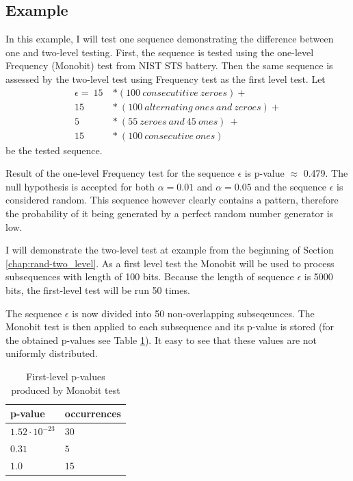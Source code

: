 \documentclass[
  digital,     %
  oneside,     %
  nosansbold,  %
  nocolorbold, %
  nolof,         %
  nolot,         %
]{fithesis4}
\begin{document}
\subsection{Example}
In this example, I will test one sequence demonstrating the difference between one and two-level testing. First, the sequence is tested using the one-level Frequency (Monobit) test from NIST STS battery.\cite[p. 2-2]{nist_special} Then the same sequence is assessed by the two-level test using Frequency test as the first level test. Let
\[\begin{split}
    \epsilon =\:15\: &* (100\:consecutitive\:zeroes) + \\
    15\:&*\:(100\:alternating\:ones\:and\:zeroes) + \\
    5\:&*\:(55\:zeroes\:and\:45\:ones)\:+\:\\
    15\:&*\:(100\:consecutive\:ones)
\end{split}\]
be the tested sequence. 

Result of the one-level Frequency test for the sequence $\epsilon$ is p-value $\approx$ 0.479. The null hypothesis is accepted for both $\alpha = 0.01$ and $\alpha = 0.05$ and the sequence $\epsilon$ is considered random. This sequence however clearly contains a pattern, therefore the probability of it being generated by a perfect random number generator is low.




I will demonstrate the two-level test at example from the beginning of Section \ref{chap:rand-two_level}. As a first level test the Monobit \cite[p. 2-2]{nist_special} will be used to process subsequences with length of 100 bits. Because the length of sequence $\epsilon$ is 5000 bits, the first-level test will be run 50 times.

The sequence $\epsilon$ is now divided into 50 non-overlapping subseqeunces. The Monobit test is then applied to each subsequence  and its p-value is stored (for the obtained p-values see Table \ref{tab:first_pvalues}). It easy to see that these values are not uniformly distributed.

\begin{table}
  \begin{tabularx}{0.4\textwidth}{ll}
    \toprule
    p-value & occurrences  \\
    \midrule
    $1.52 \cdot 10^{-23}$ & $30$\\
    $0.31$ & $5$\\
    $1.0$ & $15$\\
    \bottomrule
  \end{tabularx}
  \caption{First-level p-values produced by Monobit test}
  \label{tab:first_pvalues}
\end{table}
\end{document}
